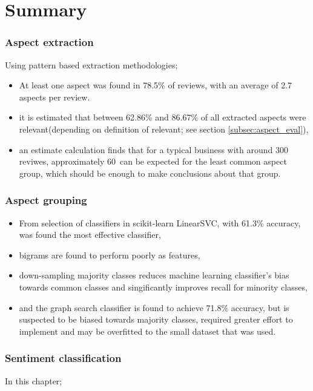 \documentclass[a4paper,11pt]{kth-mag}
\newcommand{\numValueAspects}{60}
\begin{document}
\chapter{Summary}

\subsection{Aspect extraction}
Using pattern based extraction methodologies;
\begin{itemize}
\item At least one aspect was found in 78.5\% of reviews, with an average of 2.7 aspects per review.

\item it is estimated that between 62.86\% and 86.67\% of all extracted aspects were relevant(depending on definition of relevant; see section \ref{subsec:aspect_eval}),

\item an estimate calculation finds that for a typical business with around 300 reviwes,
approximately \numValueAspects~can be expected for the least common aspect group, which should be enough to make conclusions about that group.
\end{itemize}


\subsection{Aspect grouping}
\begin{itemize}
\item From selection of classifiers in scikit-learn LinearSVC, with 61.3\% accuracy, was found the most effective classifier,
\item bigrams are found to perform poorly as features,
\item down-sampling majority classes reduces machine learning classifier's bias towards common classes and
  singificantly improves recall for minority classes,
\item and the graph search classifier is found to achieve 71.8\% accuracy, but is suspected to be biased towards
  majority classes, required greater effort to implement and may be overfitted to the small dataset that was used.

\end{itemize}


\subsection{Sentiment classification}
In this chapter;
\end{document}
